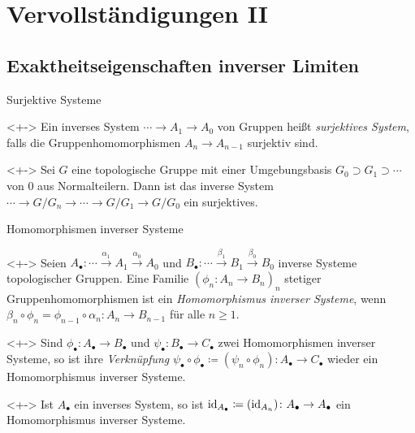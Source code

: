 \section{Vervollständigungen II}

\subsection{Exaktheitseigenschaften inverser Limiten}

\begin{frame}{Surjektive Systeme}
	\begin{definition}<+->
		Ein inverses System \(\dotsb \to A_1 \to A_0\) von Gruppen heißt \emph{surjektives System}, falls
		die Gruppenhomomorphismen \(A_n \to A_{n - 1}\) surjektiv sind.
	\end{definition}
	\begin{example}<+->
		Sei \(G\) eine topologische Gruppe mit einer Umgebungsbasis \(G_0 \supset G_1 \supset \dotsb\) von
		\(0\) aus Normalteilern. Dann ist das inverse System \(\dotsb \to G/G_n \to \dotsb \to G/G_1 \to G/G_0\)
		ein surjektives.
	\end{example}
\end{frame}

\begin{frame}{Homomorphismen inverser Systeme}
	\begin{definition}<+->
		Seien \(A_\bullet\colon \dotsb \xrightarrow{\alpha_1} A_1 \xrightarrow{\alpha_0} A_0\) und
		\(B_\bullet\colon \dotsb \xrightarrow{\beta_1} B_1 \xrightarrow{\beta_0} B_0\) inverse Systeme
		topologischer Gruppen. Eine Familie \((\phi_n\colon A_n \to B_n)_n\) stetiger Gruppenhomomorphismen
		ist ein \emph{Homomorphismus inverser Systeme}, wenn \(\beta_n \circ \phi_n = \phi_{n - 1} \circ \alpha_n\colon A_n \to
		B_{n - 1}\) für alle \(n \ge 1\).
	\end{definition}
	\begin{example}<+->
		Sind \(\phi_\bullet\colon A_\bullet \to B_\bullet\)
		und \(\psi_\bullet\colon B_\bullet \to C_\bullet\) zwei Homomorphismen inverser Systeme, so ist ihre
		\emph{Verknüpfung} \(\psi_\bullet \circ \phi_\bullet \coloneqq (\psi_n \circ \phi_n)\colon A_\bullet \to
		C_\bullet\) wieder ein Homomorphismus inverser Systeme.
	\end{example}
	\begin{example}<+->
		Ist \(A_\bullet\) ein inverses System, so ist \(\operatorname{id}_{A_\bullet} \coloneqq (\operatorname{id}_{A_n})\colon
		A_\bullet \to A_\bullet\) ein Homomorphismus inverser Systeme.
	\end{example}
\end{frame}

